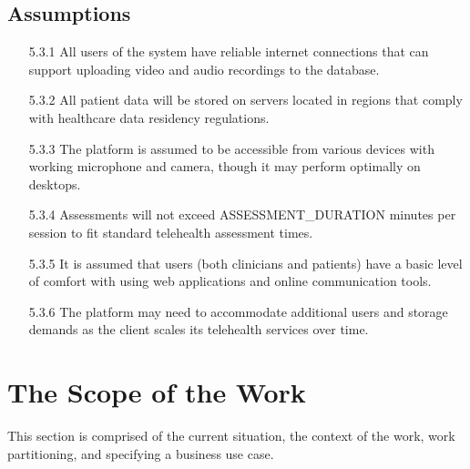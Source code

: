 \documentclass[12pt]{article}
\begin{document}
\subsection{Assumptions}
\begin{itemize}
  \item[5.3.1] All users of the system have reliable internet connections that can support uploading video and audio recordings to the database.
  \item[5.3.2] All patient data will be stored on servers located in regions that comply with healthcare data residency regulations.
  \item[5.3.3] The platform is assumed to be accessible from various devices with working microphone and camera, though it may perform optimally on 
  desktops.
  \item[5.3.4] Assessments will not exceed ASSESSMENT\_DURATION minutes per session to fit standard telehealth assessment times.
  \item[5.3.5] It is assumed that users (both clinicians and patients) have a basic level of comfort with using web applications and online 
  communication tools.
  \item[5.3.6] The platform may need to accommodate additional users and storage demands as the client scales its telehealth services over time.
\end{itemize}

\newpage

\section{The Scope of the Work}
\hspace{2em}This section is comprised of the current situation, the context of the work, work partitioning, and specifying a business use case.
\end{document}
